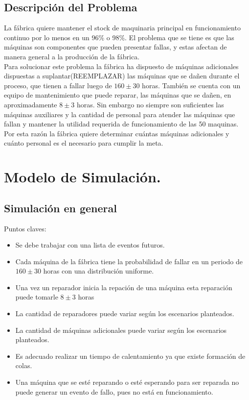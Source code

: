 \documentclass[10pt]{article}
\begin{document}
\subsection{Descripción del Problema}

La fábrica quiere mantener el stock de maquinaria principal en funcionamiento continuo por lo menos en un 96\% o 98\%. El problema que se tiene es que las máquinas son componentes que pueden presentar fallas, y estas afectan de manera general a la producción de la fábrica.\\

Para solucionar este problema la fábrica ha dispuesto de máquinas adicionales dispuestas a suplantar(REEMPLAZAR) las máquinas que se dañen durante el proceso, que tienen a fallar luego de $160\pm30$ horas. También se cuenta con un equipo de mantenimiento que puede reparar, las máquinas que se dañen, en aproximadamente $8\pm3$ horas. Sin embargo no siempre son suficientes las máquinas auxiliares y la cantidad de personal para atender las máquinas que fallan y mantener la utilidad requerida de funcionamiento de las 50 maquinas. Por esta razón la fábrica quiere determinar cuántas máquinas adicionales y cuánto personal es el necesario para cumplir la meta.

\section{Modelo de Simulación.}

\subsection{Simulación en general}

Puntos claves:
\begin{itemize}
\item Se debe trabajar con una lista de eventos futuros.
\item Cada máquina de la fábrica tiene la probabilidad de fallar en un periodo de $160\pm30$ horas con una distribución uniforme.
\item Una vez un reparador inicia la repación de una máquina esta reparación puede tomarle $8\pm3$ horas 
\item La cantidad de reparadores puede variar según los escenarios planteados.
\item La cantidad de máquinas adicionales puede variar según los escenarios planteados.
\item Es adecuado realizar un tiempo de calentamiento ya que existe formación de colas.
\item Una máquina que se esté reparando o esté esperando para ser reparada no puede generar un evento de fallo, pues no está en funcionamiento. 
\end{itemize}
\end{document}
